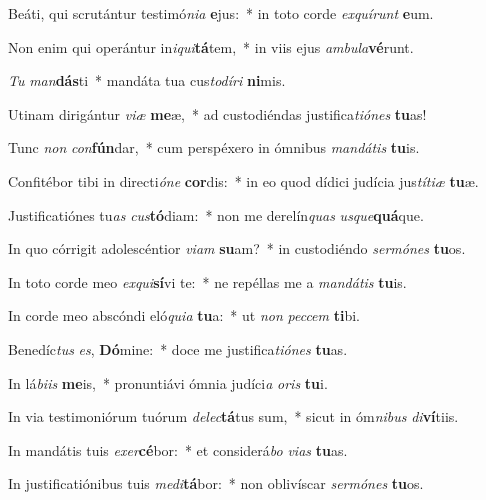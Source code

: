\item Beáti, qui scrutántur testimó\textit{ni}\textit{a} \textbf{e}jus:~* in toto corde \textit{ex}\textit{quí}\textit{runt} \textbf{e}um.
\item Non enim qui operántur in\textit{i}\textit{qui}\textbf{tá}tem,~* in viis ejus \textit{am}\textit{bu}\textit{la}\textbf{vé}runt.
\item \textit{Tu} \textit{man}\textbf{dás}ti~* mandáta tua cus\textit{to}\textit{dí}\textit{ri} \textbf{ni}mis.
\item Utinam dirigántur \textit{vi}\textit{æ} \textbf{me}æ,~* ad custodiéndas justifica\textit{ti}\textit{ó}\textit{nes} \textbf{tu}as!
\item Tunc \textit{non} \textit{con}\textbf{fún}dar,~* cum perspéxero in ómnibus \textit{man}\textit{dá}\textit{tis} \textbf{tu}is.
\item Confitébor tibi in directi\textit{ó}\textit{ne} \textbf{cor}dis:~* in eo quod dídici judícia jus\textit{tí}\textit{ti}\textit{æ} \textbf{tu}æ.
\item Justificatiónes tu\textit{as} \textit{cus}\textbf{tó}diam:~* non me derelín\textit{quas} \textit{us}\textit{que}\textbf{quá}que.
\item In quo córrigit adolescéntior \textit{vi}\textit{am} \textbf{su}am?~* in custodiéndo \textit{ser}\textit{mó}\textit{nes} \textbf{tu}os.
\item In toto corde meo \textit{ex}\textit{qui}\textbf{sí}vi te:~* ne repéllas me a \textit{man}\textit{dá}\textit{tis} \textbf{tu}is.
\item In corde meo abscóndi eló\textit{qui}\textit{a} \textbf{tu}a:~* ut \textit{non} \textit{pec}\textit{cem} \textbf{ti}bi.
\item Benedíc\textit{tus} \textit{es}, \textbf{Dó}mine:~* doce me justifica\textit{ti}\textit{ó}\textit{nes} \textbf{tu}as.
\item In lá\textit{bi}\textit{is} \textbf{me}is,~* pronuntiávi ómnia judíci\textit{a} \textit{o}\textit{ris} \textbf{tu}i.
\item In via testimoniórum tuórum \textit{de}\textit{lec}\textbf{tá}tus sum,~* sicut in óm\textit{ni}\textit{bus} \textit{di}\textbf{ví}tiis.
\item In mandátis tuis \textit{ex}\textit{er}\textbf{cé}bor:~* et considerá\textit{bo} \textit{vi}\textit{as} \textbf{tu}as.
\item In justificatiónibus tuis \textit{me}\textit{di}\textbf{tá}bor:~* non oblivíscar \textit{ser}\textit{mó}\textit{nes} \textbf{tu}os.
